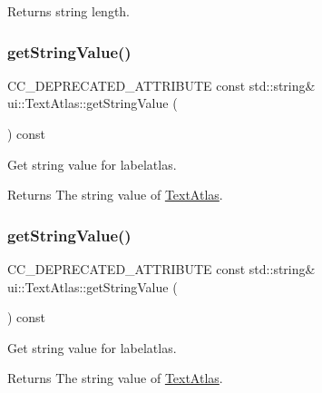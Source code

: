 \begin{DoxyReturn}{Returns}
string length. 
\end{DoxyReturn}
\mbox{\label{classui_1_1TextAtlas_a02a1ddc7ce3e45c8591d051e6f1471c6}} 
\subsubsection{\texorpdfstring{get\+String\+Value()}{getStringValue()}\hspace{0.1cm}{\footnotesize\ttfamily [1/2]}}
{\footnotesize\ttfamily C\+C\+\_\+\+D\+E\+P\+R\+E\+C\+A\+T\+E\+D\+\_\+\+A\+T\+T\+R\+I\+B\+U\+TE const std\+::string\& ui\+::\+Text\+Atlas\+::get\+String\+Value (\begin{DoxyParamCaption}{ }\end{DoxyParamCaption}) const\hspace{0.3cm}{\ttfamily [inline]}}

Get string value for labelatlas.

\begin{DoxyReturn}{Returns}
The string value of \hyperlink{classui_1_1TextAtlas}{Text\+Atlas}. 
\end{DoxyReturn}
\mbox{\label{classui_1_1TextAtlas_a02a1ddc7ce3e45c8591d051e6f1471c6}} 
\subsubsection{\texorpdfstring{get\+String\+Value()}{getStringValue()}\hspace{0.1cm}{\footnotesize\ttfamily [2/2]}}
{\footnotesize\ttfamily C\+C\+\_\+\+D\+E\+P\+R\+E\+C\+A\+T\+E\+D\+\_\+\+A\+T\+T\+R\+I\+B\+U\+TE const std\+::string\& ui\+::\+Text\+Atlas\+::get\+String\+Value (\begin{DoxyParamCaption}{ }\end{DoxyParamCaption}) const\hspace{0.3cm}{\ttfamily [inline]}}

Get string value for labelatlas.

\begin{DoxyReturn}{Returns}
The string value of \hyperlink{classui_1_1TextAtlas}{Text\+Atlas}. 
\end{DoxyReturn}
\mbox{\label{classui_1_1TextAtlas_a7341add4e53083db9de33dd5ab7eb0bd}} 
